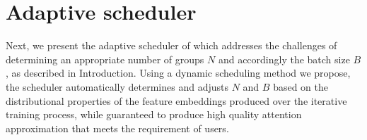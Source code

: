 \vspace{-2mm}
\section{Adaptive scheduler}
\label{sec.scheduler}
Next, we present the adaptive scheduler of \system which addresses the challenges of determining an appropriate number of groups $N$ and accordingly the batch size $B$, as described in Introduction. Using a dynamic scheduling method we propose, the scheduler automatically determines and adjusts $N$ and $B$ based on the distributional properties of the feature embeddings produced over the iterative training process, while guaranteed to produce high quality attention approximation that meets the requirement of users.  






